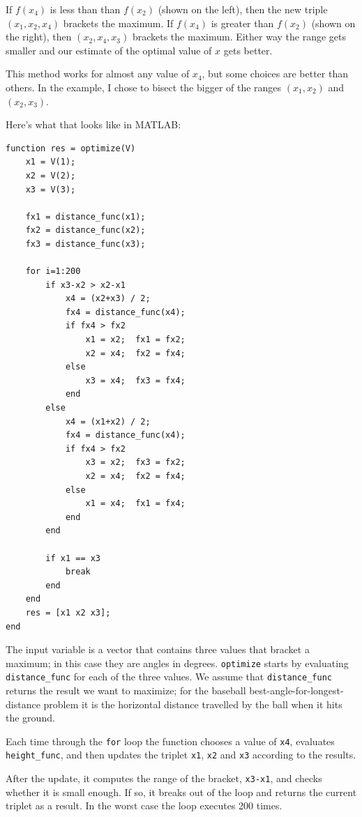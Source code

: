 \documentclass{book}
\begin{document}
If $f(x_4)$ is less than than $f(x_2)$ (shown on the left), then the
new triple $(x_1, x_2, x_4)$ brackets the maximum.  If $f(x_4)$ is
greater than $f(x_2)$ (shown on the right), then $(x_2, x_4, x_3)$
brackets the maximum.  Either way the range gets smaller and our
estimate of the optimal value of $x$ gets better.

This method works for almost any value of $x_4$, but some choices
are better than others.  In the example, I chose to bisect the
bigger of the ranges $(x_1, x_2)$ and $(x_2, x_3)$.

Here's what that looks like in MATLAB:

\begin{verbatim}
function res = optimize(V)
    x1 = V(1);
    x2 = V(2);
    x3 = V(3);

    fx1 = distance_func(x1);
    fx2 = distance_func(x2);
    fx3 = distance_func(x3);

    for i=1:200
        if x3-x2 > x2-x1
            x4 = (x2+x3) / 2;
            fx4 = distance_func(x4);
            if fx4 > fx2
                x1 = x2;  fx1 = fx2;
                x2 = x4;  fx2 = fx4;
            else
                x3 = x4;  fx3 = fx4;
            end
        else
            x4 = (x1+x2) / 2;
            fx4 = distance_func(x4);
            if fx4 > fx2
                x3 = x2;  fx3 = fx2;
                x2 = x4;  fx2 = fx4;
            else
                x1 = x4;  fx1 = fx4;
            end
        end

        if x1 == x3
            break
        end
    end
    res = [x1 x2 x3];
end
\end{verbatim}

The input variable is a vector that contains three values that bracket
a maximum; in this case they are angles in degrees.  {\tt optimize}
starts by evaluating {\tt distance\_func} for each of the three values.
We assume that {\tt distance\_func} returns the result we want to
maximize; for the baseball best-angle-for-longest-distance problem
it is the horizontal distance travelled by the
ball when it hits the ground.


Each time through the {\tt for} loop the function chooses a value
of {\tt x4}, evaluates {\tt height\_func}, and then updates the
triplet {\tt x1}, {\tt x2} and {\tt x3} according to the results.

After the update, it computes the range of the bracket, {\tt x3-x1},
and checks whether it is small enough.  If so, it breaks out of
the loop and returns the current triplet as a result.  In the
worst case the loop executes 200 times.
\end{document}
